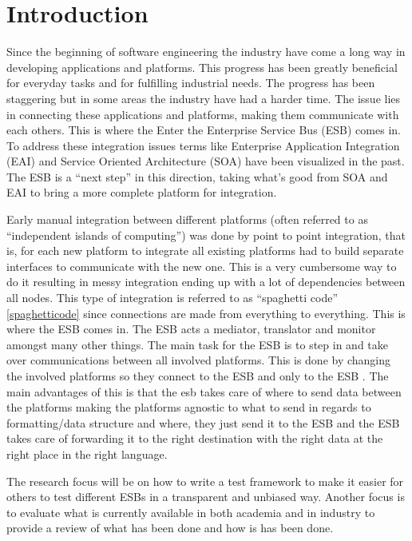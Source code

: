 \section{Introduction}

Since the beginning of software engineering the industry have come a long way in developing applications and platforms. 
This progress has been greatly beneficial for everyday tasks and for fulfilling industrial needs. 
The progress has been staggering but in some areas the industry have had a harder time. 
The issue lies in connecting these applications and platforms, making them communicate with each others. This is where the Enter the Enterprise Service Bus (ESB) \cite{falko07} comes in. 
To address these integration issues terms like Enterprise Application Integration (EAI) \cite{Du2008} and Service Oriented Architecture (SOA) \cite{Abuosba2008} have been visualized in the past. 
The ESB is a ``next step'' in this direction, taking what's good from SOA and EAI to bring a more complete platform for integration.

Early manual integration between different platforms (often referred to as ``independent islands of computing'') was done by point to point integration, that is, for each new platform to integrate all existing platforms had to build separate interfaces to communicate with the new one. 
This is a very cumbersome way to do it resulting in messy integration ending up with a lot of dependencies between all nodes.
This type of integration is referred to as ``spaghetti code'' \ref{spaghetticode} since connections are made from everything to everything. 
This is where the ESB comes in. The ESB acts a mediator, translator and monitor amongst many other things. The main task for the ESB is to step in and take over communications between all involved platforms. 
This is done by changing the involved platforms so they connect to the ESB and only to the ESB \cite{Sanjay2011}. 
The main advantages of this is that the esb takes care of where to send data between the platforms making the platforms agnostic to what to send in regards to formatting/data structure and where, they just send it to the ESB and the ESB takes care of forwarding it to the right destination with the right data at the right place in the right language.

The research focus will be on how to write a test framework to make it easier for others to test different ESBs in a transparent and unbiased way. 
Another focus is to evaluate what is currently available in both academia and in industry to provide a review of what has been done and how is has been done.

